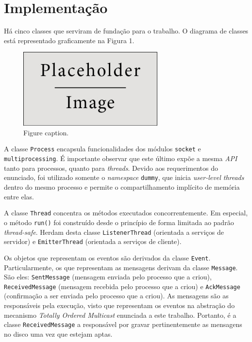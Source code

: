\documentclass[a4paper,12pt]{article}
\begin{document}
        \section{Implementação}
        
        Há cinco classes que serviram de fundação para o trabalho.
        O diagrama de classes está representado graficamente na Figura 1.

        \begin{figure}[h]
            \begin{center}
                \includegraphics[width=0.65\textwidth]{placeholder_1} %
                \caption{Figure caption.}
            \end{center}
        \end{figure}

        A classe \texttt{Process} encapsula funcionalidades dos módulos \texttt{socket} \cite{WEBSITE:7} e \texttt{multiprocessing}.
        É importante observar que este último expõe a mesma \emph{API} tanto para processos, quanto para \emph{threads}.
        Devido aos requerimentos do enunciado, foi utilizado somente o \emph{namespace} \texttt{dummy}, que inicia \emph{user-level threads} dentro do mesmo processo e permite o compartilhamento implícito de memória entre elas.

        A classe \texttt{Thread} concentra os métodos executados concorrentemente.
        Em especial, o método \texttt{run()} foi construído desde o princípio de forma limitada ao padrão \emph{thread-safe}.
        Herdam desta classe \texttt{ListenerThread} (orientada a serviços de servidor) e \texttt{EmitterThread} (orientada a serviços de cliente).

        Os objetos que representam os eventos são derivados da classe \texttt{Event}.
        Particularmente, os que representam as mensagens derivam da classe \texttt{Message}.
        São eles: \texttt{SentMessage} (mensagem enviada pelo processo que a criou), \texttt{ReceivedMessage} (mensagem recebida pelo processo que a criou) e \texttt{AckMessage} (confirmação a ser enviada pelo processo que a criou).
        As mensagens são as responsáveis pela execução, visto que representam os eventos na abstração do mecanismo \emph{Totally Ordered Multicast} enunciada a este trabalho.
        Portanto, é a classe \texttt{ReceivedMessage} a responsável por gravar pertinentemente as mensagens no disco uma vez que estejam aptas.
\end{document}
